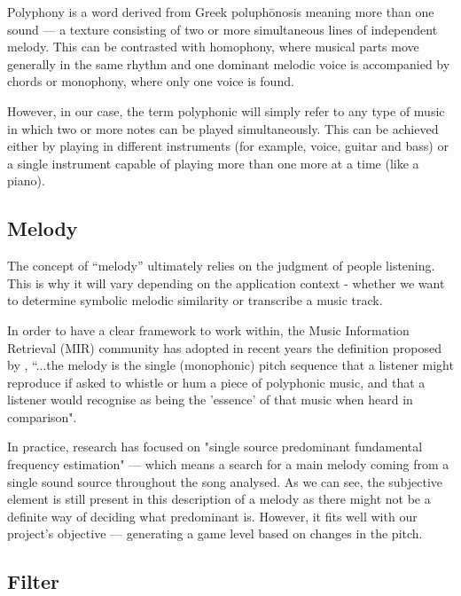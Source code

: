 Polyphony is a word derived from Greek poluph\={o}nosis meaning more than one sound — a texture consisting of two or more simultaneous lines of independent melody. This can be contrasted with homophony, where musical parts move generally in the same rhythm and one dominant melodic voice is accompanied by chords or monophony, where only one voice is found. 

However, in our case, the term polyphonic will simply refer to any type of music in which two or more notes can be played simultaneously. This can be achieved either by playing in different instruments (for example, voice, guitar and bass) or a single instrument capable of playing more than one more at a time (like a piano).

\vspace{10pt}

\subsection{Melody}

The concept of “melody” ultimately relies on the judgment of people listening. This is why it will vary depending on the application context - whether we want to determine symbolic melodic similarity or transcribe a music track. 

In order to have a clear framework to work within, the Music Information Retrieval (MIR) community has adopted in recent years the definition proposed by \cite{melodydef}, “...the melody is the single (monophonic) pitch sequence that a listener might reproduce if asked to whistle or hum a piece of polyphonic music, and that a listener would recognise as being the 'essence' of that music when heard in comparison".

In practice, research has focused on "single source predominant fundamental frequency estimation" — which means a search for a main melody coming from a single sound source throughout the song analysed. As we can see, the subjective element is still present in this description of a melody as there might not be a definite way of deciding what predominant is. However, it fits well with our project’s objective — generating a game level based on changes in the pitch.

\vspace{10pt}

\subsection{Filter}

